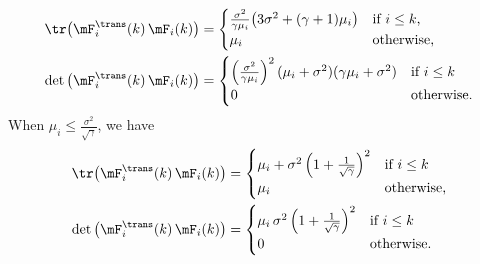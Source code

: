 \begin{subequations}
\begin{align}\label{E:tr-det-F-above-a}
    \tr \big( \mF_i^\trans(k) \, \mF_i(k) \big)
        &=
            \begin{cases}
                \frac{\sigma^2}{\gamma \mu_i}
                \big(
                    3 \sigma^2 + (\gamma+1) \mu_i
                \big)
                    &\text{if $i \leq k$,} \\
                \mu_i
                    &\text{otherwise,}
            \end{cases} \\
    \det \big( \mF_i^\trans(k) \, \mF_i(k) \big)
        &=
            \begin{cases}
                \left(
                    \frac{\sigma^2}{\gamma \mu_i}
                \right)^2
                (\mu_i + \sigma^2)
                (\gamma \mu_i + \sigma^2)
                    &\text{if $i \leq k$} \\
                0
                    &\text{otherwise.}
            \end{cases}
\end{align}
\end{subequations}
When $\mu_i \leq \frac{\sigma^2}{\sqrt{\gamma}}$, we have
\begin{subequations}
\begin{align}
    \tr \big( \mF_i^\trans(k) \, \mF_i(k) \big)
        &=
            \begin{cases}
                \mu_i 
                +
                \sigma^2
                \left(
                    1 + \frac{1}{\sqrt{\gamma}}
                \right)^2
                    &\text{if $i \leq k$} \\
                \mu_i
                    &\text{otherwise,}
            \end{cases} \\
    \label{E:tr-det-F-below-b}
    \det \big( \mF_i^\trans(k) \, \mF_i(k) \big)
        &=
            \begin{cases}
                \mu_i \,
                \sigma^2
                \left(
                    1 + \frac{1}{\sqrt{\gamma}}
                \right)^2
                    &\text{if $i \leq k$} \\
                0
                    &\text{otherwise.}
            \end{cases}
\end{align}
\end{subequations}
